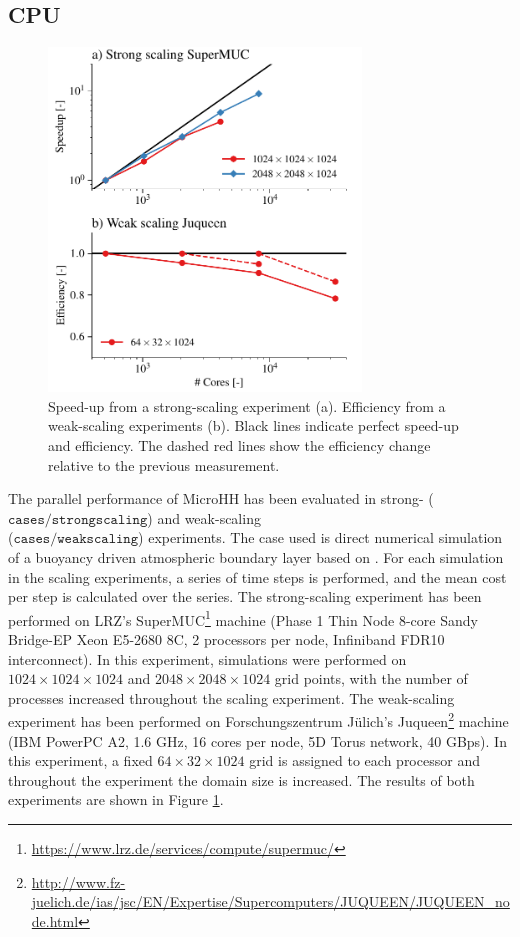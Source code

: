 \documentclass[gmd,manuscript]{copernicus}
\begin{document}
\subsection{CPU}
\begin{figure}[!hbt]
	\vspace*{2mm}
	\begin{center}
		\includegraphics[width=8.3cm]{figs/scaling.pdf}
	\end{center}
	\caption{Speed-up from a strong-scaling experiment (a). Efficiency from a weak-scaling experiments (b). Black lines indicate perfect speed-up and efficiency. The dashed red lines show the efficiency change relative to the previous measurement.}\label{fig:scaling}
\end{figure}
The parallel performance of MicroHH has been evaluated in strong- ($\texttt{cases/strongscaling}$) and weak-scaling\\ ($\texttt{cases/weakscaling}$) experiments. The case used is direct numerical simulation of a buoyancy driven atmospheric boundary layer based on \citet{vanHeerwaarden2014}. For each simulation in the scaling experiments, a series of time steps is performed, and the mean cost per step is calculated over the series. The strong-scaling experiment has been performed on LRZ's SuperMUC\footnote{\url{https://www.lrz.de/services/compute/supermuc/}} machine (Phase 1 Thin Node 8-core Sandy Bridge-EP Xeon E5-2680 8C, 2 processors per node, Infiniband FDR10 interconnect). In this experiment, simulations were performed on $1024 \times 1024 \times 1024$ and $2048 \times 2048 \times 1024$ grid points, with the number of processes increased throughout the scaling experiment. The weak-scaling experiment has been performed on Forschungszentrum J\"{u}lich's Juqueen\footnote{\url{http://www.fz-juelich.de/ias/jsc/EN/Expertise/Supercomputers/JUQUEEN/JUQUEEN_node.html}} machine (IBM PowerPC A2, 1.6 GHz, 16 cores per node, 5D Torus network, 40 GBps). In this experiment, a fixed $64 \times 32 \times 1024$ grid is assigned to each processor and throughout the experiment the domain size is increased. The results of both experiments are shown in Figure \ref{fig:scaling}.
\end{document}
